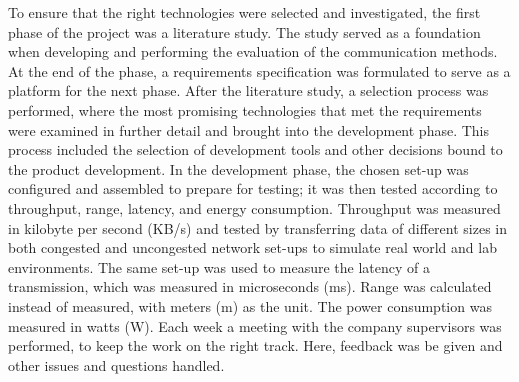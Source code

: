 To ensure that the right technologies were selected and investigated,
	the first phase of the project was a literature study.
The study served as a foundation when developing and performing the evaluation of the communication methods.
At the end of the phase,
	a requirements specification was formulated to serve as a platform for the next phase.
After the literature study,
	a selection process was performed,
	where the most promising technologies that met the requirements were examined in further detail and brought into the development phase.
This process included the selection of development tools and other decisions bound to the product development.
In the development phase,
	the chosen set-up was configured and assembled to prepare for testing;
	it was then tested according to throughput,
	range,
	latency,
	and energy consumption.
Throughput was measured in kilobyte per second (KB/s) and tested by transferring data of different sizes in both congested and uncongested network set-ups to simulate real world and lab environments.
The same set-up was used to measure the latency of a transmission,
	which was measured in microseconds (ms).
Range was calculated instead of measured,
	with meters (m) as the unit.
The power consumption was measured in watts (W).
Each week a meeting with the company supervisors was performed,
	to keep the work on the right track.
Here,
	feedback was be given and other issues and questions handled.

